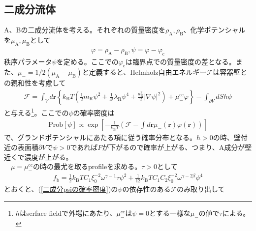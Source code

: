 \documentclass[a4paper,12pt, oneside, openany]{jsbook}
\begin{document}
\subsection{二成分流体}
A、Bの二成分流体を考える。それぞれの質量密度を$\rho_{\text{A}},\rho_{\text{B}}$、化学ポテンシャルを$\mu_{\text{A}},\mu_{\text{B}}$として
\begin{eqnarray}
  \varphi = \rho_{\text{A}}-\rho_{\text{B}},\psi = \varphi -\varphi_{\text{c}}
\end{eqnarray}
秩序パラメータ$\psi$を定める。ここでの$\varphi_{\text{c}}$は臨界点での質量密度の差となる。また、$\mu_-=1/2(\mu_{\text{A}}-\mu_{\text{B}})$と定義すると、Helmholz自由エネルギー$\mathcal{F}$は容器壁との親和性を考慮して
\begin{eqnarray}
  \mathcal{F}=\int _Vd\boldsymbol{r}\left\{k_{\text{B}}T\left(\frac{1}{2}m_{\text{R}}\psi^2 +\frac{1}{4!}\lambda_{\text{R}}\psi^4 +\frac{a^2_{\text{R}}}{2}\left\lvert \nabla \psi\right\rvert^2 \right) +\mu_-^{\text{cc}} \varphi\right\} -\int_{\partial V} dS h\psi
\end{eqnarray}
と与える\footnote{$h$はserface fieldで外場にあたり、$\mu_-^{cc}$は$\psi=0$とする一様な$\mu_-$の値で$\tau$による。}。ここでの$\psi$の確率密度は
\begin{eqnarray}
  \label{二成分psiの確率密度}
  \text{Prob}\left[\psi\right] \propto \exp \left[ -\frac{1}{k_{\text{B}}T}\left(\mathcal{F}-\int d\boldsymbol{r} \mu_-(\boldsymbol{r})\varphi (\boldsymbol{r})\right) \right] 
\end{eqnarray}
で、グランドポテンシャルにあたる項に従う確率分布となる。$h>0$の時、壁付近の表面積$\partial V$で$\psi >0 $であれば$F$が下がるので確率が上がる、つまり、A成分が壁近くで濃度が上がる。\\
　$\mu=\mu_-^{\text{cc}}$の時の最尤を取るprofileを求める。$\tau >0$として
\begin{eqnarray}
  \label{f_b定義}
  f_{\text{b}}=\frac{1}{2} k_{\text{B}} TC_1 \xi_0^{-2}\omega ^{\gamma -1}\tau \psi ^2 +\frac{1}{12} k_{\text{B}}TC_1 C_2 \xi_0 ^{-2} \omega^{\gamma -2\beta} \psi^4
\end{eqnarray}
とおくと、(\ref{二成分psiの確率密度})の$\psi$の依存性のある$\mathcal{F}$のみ取り出して
\footnotesize
\end{document}
